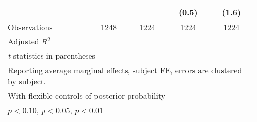 \begin{table}[htbp]
\begin{tabular}{l*{4}{c}}
                &                  &                  &    (0.5)         &    (1.6)         \\
\hline
Observations    &     1248         &     1224         &     1224         &     1224         \\
Adjusted \(R^{2}\)&                  &                  &                  &                  \\
\hline\hline
\multicolumn{5}{l}{\footnotesize \textit{t} statistics in parentheses}\\
\multicolumn{5}{l}{\footnotesize Reporting average marginal effects, subject FE, errors are clustered by subject.}\\
\multicolumn{5}{l}{\footnotesize With flexible controls of posterior probability}\\
\multicolumn{5}{l}{\footnotesize \sym{*} \(p<0.10\), \sym{**} \(p<0.05\), \sym{***} \(p<0.01\)}\\
\end{tabular}
\end{table}
